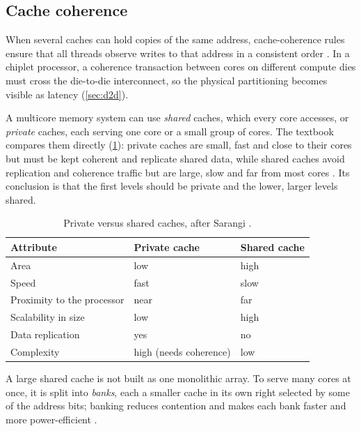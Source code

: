 \subsection{Cache coherence}
When several caches can hold copies of the same address, \gls{cache-coherence} rules ensure that all threads observe writes to that address in a consistent order \cite[sec.~12.4.2]{sarangi2025basic}. In a chiplet processor, a coherence transaction between cores on different compute dies must cross the die-to-die interconnect, so the physical partitioning becomes visible as latency (\cref{sec:d2d}).

A multicore memory system can use \emph{shared} caches, which every core accesses, or \emph{private} caches, each serving one core or a small group of cores. The textbook compares them directly (\cref{tab:shared-private}): private caches are small, fast and close to their cores but must be kept coherent and replicate shared data, while shared caches avoid replication and coherence traffic but are large, slow and far from most cores \cite[sec.~12.4.4]{sarangi2025basic}. Its conclusion is that the first levels should be private and the lower, larger levels shared.

\begin{table}[htbp]
  \centering
  \caption[Private versus shared caches, after Sarangi]{Private versus shared caches, after Sarangi \cite[Table~12.3]{sarangi2025basic}.}
  \label{tab:shared-private}
  \small
  \begin{tabular}{@{}lll@{}}
    \toprule
    \textbf{Attribute} & \textbf{Private cache} & \textbf{Shared cache} \\
    \midrule
    Area & low & high \\
    Speed & fast & slow \\
    Proximity to the processor & near & far \\
    Scalability in size & low & high \\
    Data replication & yes & no \\
    Complexity & high (needs coherence) & low \\
    \bottomrule
  \end{tabular}
\end{table}

A large shared cache is not built as one monolithic array. To serve many cores at once, it is split into \emph{banks}, each a smaller cache in its own right selected by some of the address bits; banking reduces contention and makes each bank faster and more power-efficient \cite[sec.~12.4.5]{sarangi2025basic}.

